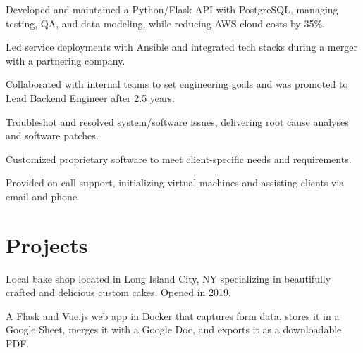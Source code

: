\documentclass[]{plushcv}
\begin{document}
\begin{minipage}[t]{0.70\textwidth}
\begin{tightemize}
\sectionsep
\item Developed and maintained a Python/Flask API with PostgreSQL, managing testing, QA, and data modeling, while reducing AWS cloud costs by 35\%.
\item Led service deployments with Ansible and integrated tech stacks during a merger with a partnering company.
\item Collaborated with internal teams to set engineering goals and was promoted to Lead Backend Engineer after 2.5 years.
\end{tightemize}
\sectionsep

\begin{tightemize}
\sectionsep
\item Troubleshot and resolved system/software issues, delivering root cause analyses and software patches.
\item Customized proprietary software to meet client-specific needs and requirements.
\item Provided on-call support, initializing virtual machines and assisting clients via email and phone.
\end{tightemize}



\section{Projects}

\begin{tightemize}
\item Local bake shop located in Long Island City, NY specializing in beautifully crafted and delicious custom cakes. Opened in 2019.
\end{tightemize}
\sectionsep

\begin{tightemize}
\item A Flask and Vue.js web app in Docker that captures form data, stores it in a Google Sheet, merges it with a Google Doc, and exports it as a downloadable PDF.
\end{tightemize}
\sectionsep


\end{minipage}
\end{document}
